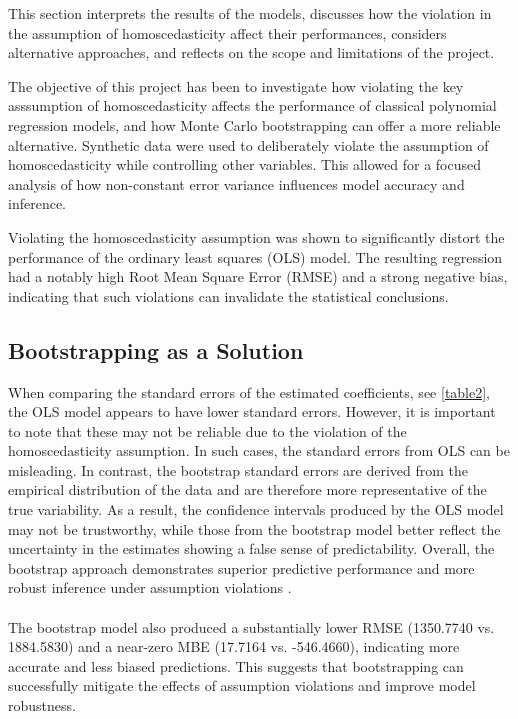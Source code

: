 This section interprets the results of the models, discusses how the violation in the assumption of homoscedasticity affect their performances, considers alternative approaches, and reflects on the scope and limitations of the project.
\newline

\noindent The objective of this project has been to investigate how violating the key asssumption of homoscedasticity affects the performance of classical polynomial regression models, and how Monte Carlo bootstrapping can offer a more reliable alternative. Synthetic data were used to deliberately violate the assumption of homoscedasticity while controlling other variables. This allowed for a focused analysis of how non-constant error variance influences model accuracy and inference.

\noindent Violating the homoscedasticity assumption was shown to significantly distort the performance of the ordinary least squares (OLS) model. The resulting regression had a notably high Root Mean Square Error (RMSE) and a strong negative bias, indicating that such violations can invalidate the statistical conclusions. 

\subsection{Bootstrapping as a Solution}

When comparing the standard errors of the estimated coefficients, see \autoref{table2}, the OLS model appears to have lower standard errors. However, it is important to note that these may not be reliable due to the violation of the homoscedasticity assumption. In such cases, the standard errors from OLS can be misleading. In contrast, the bootstrap standard errors are derived from the empirical distribution of the data and are therefore more representative of the true variability. As a result, the confidence intervals produced by the OLS model may not be trustworthy, while those from the bootstrap model better reflect the uncertainty in the estimates showing a false sense of predictability. Overall, the bootstrap approach demonstrates superior predictive performance and more robust inference under assumption violations \cite{abcde12345}.
\\\\
\noindent The bootstrap model also produced a substantially lower RMSE (1350.7740 vs. 1884.5830) and a near-zero MBE (17.7164 vs. -546.4660), indicating more accurate and less biased predictions. This suggests that bootstrapping can successfully mitigate the effects of assumption violations and improve model robustness.

